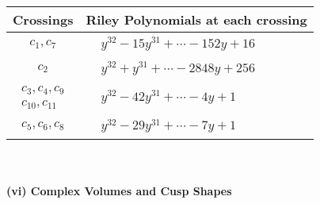 \documentclass[1p]{elsarticle_modified}
\theoremstyle{definition}
\begin{document}
\begin{tabular}{m{50pt}|m{274pt}}
Crossings & \hspace{64pt}Riley Polynomials at each crossing \\
\hline $$\begin{aligned}c_{1},c_{7}\end{aligned}$$&$\begin{aligned}
&y^{32}-15 y^{31}+\cdots-152 y+16
\end{aligned}$\\
\hline $$\begin{aligned}c_{2}\end{aligned}$$&$\begin{aligned}
&y^{32}+y^{31}+\cdots-2848 y+256
\end{aligned}$\\
\hline $$\begin{aligned}c_{3},c_{4},c_{9}\\c_{10},c_{11}\end{aligned}$$&$\begin{aligned}
&y^{32}-42 y^{31}+\cdots-4 y+1
\end{aligned}$\\
\hline $$\begin{aligned}c_{5},c_{6},c_{8}\end{aligned}$$&$\begin{aligned}
&y^{32}-29 y^{31}+\cdots-7 y+1
\end{aligned}$\\
\hline
\end{tabular}\\~\\
\newpage\flushleft \textbf{(vi) Complex Volumes and Cusp Shapes}
\end{document}
